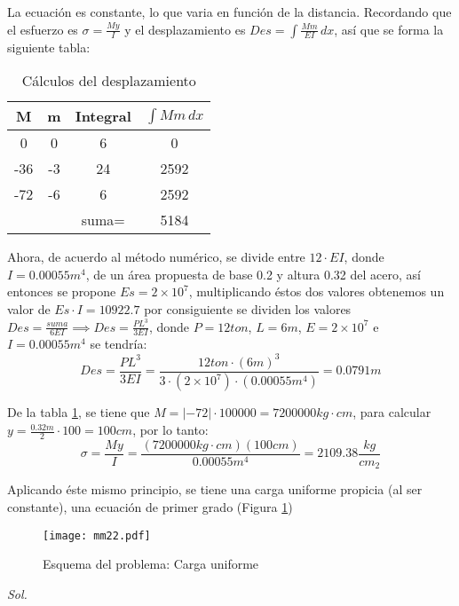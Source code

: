 La ecuación es constante, lo que varia en función de la distancia. Recordando que el esfuerzo es $\sigma=\frac{My}{I}$ y el desplazamiento es $Des=\int \frac{Mm}{EI}\,dx$,
así que se forma la siguiente tabla:
\begin{table}[h!]
    \centering
    \begin{tabular}{@{}cccc@{}}
    \toprule
    M   & m  & Integral & $\int Mm\,dx$ \\ \midrule
    0   & 0  & 6        & 0             \\
    -36 & -3 & 24       & 2592          \\
    -72 & -6 & 6        & 2592          \\
        &    & suma=    & 5184          \\ \bottomrule
    \end{tabular}
    \caption{Cálculos del desplazamiento}
    \label{tabmm7}
\end{table}
Ahora, de acuerdo al método numérico, se divide entre $12\cdot EI$, donde $I=0.00055m^4$, de un área propuesta de base 0.2 y altura 0.32 del acero, así entonces se propone $Es=2\times 10^{7}$, multiplicando éstos dos valores obtenemos un valor de $Es\cdot I=10922.7$
por consiguiente se dividen los valores $Des=\frac{suma}{6EI}\implies Des=\frac{PL^3}{3EI}$, donde $P=12ton$, $L=6m$, $E=2\times 10^{7}$ e $I=0.00055m^4$ se tendría:
\begin{equation*}
    Des =\frac{PL^3}{3EI} =\frac{12ton\cdot (6m)^3}{3\cdot \left(2\times 10^{7}\right)\cdot\left(0.00055m^4\right)}= 0.0791m
\end{equation*}

De la tabla \ref{tabmm7}, se tiene que $M=\left\lvert -72\right\rvert \cdot 100000=7200000kg\cdot cm$, para calcular $y=\frac{0.32m}{2}\cdot 100=100cm$, por lo tanto:
\begin{equation*}
    \sigma = \frac{My}{I} = \frac{\left(7200000kg\cdot cm\right)\left(100cm\right)}{0.00055m^4} = 2109.38\frac{kg}{cm_2}
\end{equation*}

\begin{example}
    Aplicando éste mismo principio, se tiene una carga uniforme propicia (al ser constante), una ecuación de primer grado (Figura \ref{mm22})
\end{example}
\begin{figure}[h!]\centering
  \texttt{[image: mm22.pdf]}
  \caption{Esquema del problema: Carga uniforme}
  \label{mm22}
\end{figure}
\textit{ Sol. }

